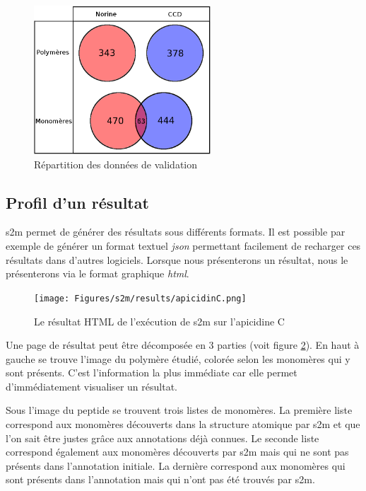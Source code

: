 \begin{figure}[!ht]
  \begin{center}
    \includegraphics[width=250px]{Figures/s2m/results/data.png}
    \caption{\label{data}Répartition des données de validation}
  \end{center}
\end{figure}



\subsection{Profil d'un résultat}

s2m permet de générer des résultats sous différents formats.
Il est possible par exemple de générer un format textuel \textit{json} permettant facilement de recharger ces résultats dans d'autres logiciels.
Lorsque nous présenterons un résultat, nous le présenterons via le format graphique \textit{html}.

\begin{figure}[!ht]
  \begin{center}
    \texttt{[image: Figures/s2m/results/apicidinC.png]}
    \caption{\label{s2m_HTML}Le résultat HTML de l'exécution de s2m sur l'apicidine C}
  \end{center}
\end{figure}

Une page de résultat peut être décomposée en 3 parties (voit figure \ref{s2m_HTML}).
En haut à gauche se trouve l'image du polymère étudié, colorée selon les monomères qui y sont présents.
C'est l'information la plus immédiate car elle permet d'immédiatement visualiser un résultat.

Sous l'image du peptide se trouvent trois listes de monomères.
La première liste correspond aux monomères découverts dans la structure atomique par s2m et que l'on sait être justes grâce aux annotations déjà connues.
Le seconde liste correspond également aux monomères découverts par s2m mais qui ne sont pas présents dans l'annotation initiale.
La dernière correspond aux monomères qui sont présents dans l'annotation mais qui n'ont pas été trouvés par s2m.

